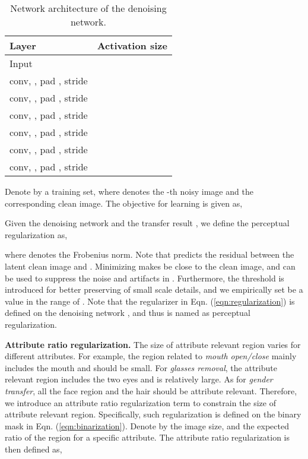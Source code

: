 \documentclass[journal]{IEEEtran}
\begin{document}
\begin{table}[htb]
\footnotesize
\caption{Network architecture of the denoising network.}
\begin{center}
\begin{tabular}{l|c}
\hline
Layer&  Activation size  \\
\hline
Input&  \\
conv, , pad ,  stride  &  \\
conv, , pad ,  stride  &  \\
conv, , pad ,  stride  &  \\
conv, , pad ,  stride  &  \\
conv, , pad ,  stride  &  \\
conv, , pad ,  stride  &  \\
\hline
\end{tabular}
\end{center}
\label{table:denoising}
\end{table}


Denote by  a training set, where  denotes the -th noisy image and  the corresponding clean image.
The objective for learning  is given as,

Given the denoising network and the transfer result , we define the perceptual regularization as,

where  denotes the Frobenius norm.
Note that  predicts the residual between the latent clean image and . Minimizing  makes  be close to the clean image, and can be used to suppress the noise and artifacts in .
Furthermore, the threshold  is introduced for better preserving of small scale details, and we empirically set  be a value in the range of .
Note that the regularizer in Eqn. (\ref{eqn:regularization}) is defined on the denoising network , and thus is named as perceptual regularization.











\textbf{Attribute ratio regularization.}\quad
The size of attribute relevant region varies for different attributes.
For example, the region related to \emph{mouth open/close} mainly includes the mouth and should be small.
For \emph{glasses removal}, the attribute relevant region includes the two eyes and is relatively large.
As for \emph{gender transfer}, all the face region and the hair should be attribute relevant.
Therefore, we introduce an attribute ratio regularization term to constrain the size of attribute relevant region.
Specifically, such regularization is defined on the binary mask in Eqn. (\ref{eqn:binarization}).
Denote by  the image size, and  the expected ratio of the region for a specific attribute.
The attribute ratio regularization is then defined as,
\end{document}
